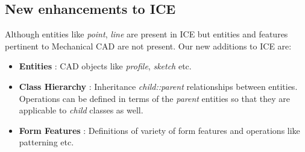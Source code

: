 \subsection{New enhancements to ICE}
%

Although entities like {\em point}, {\em line} are present in ICE but entities and features pertinent to Mechanical CAD are not present. Our new additions to ICE are:
\begin{itemize}[noitemsep,topsep=2pt,parsep=2pt,partopsep=2pt,label={},leftmargin=*]
\item {\bf Entities} : CAD objects like {\em profile}, {\em sketch} etc.
\item {\bf Class Hierarchy} : Inheritance {\em child::parent} relationships between entities. Operations can be defined in terms of the {\em parent} entities so that they are applicable to {\em child} classes as well.
\item {\bf Form Features} : Definitions of variety of form features and operations like patterning etc.
\end{itemize}


